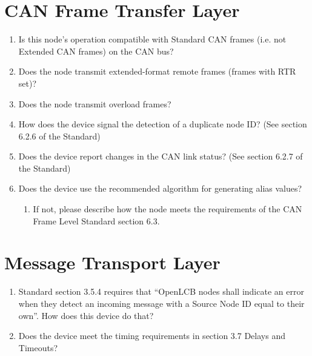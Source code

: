 \section{CAN Frame Transfer Layer}
    \begin{enumerate}
        \item Is this node's operation compatible with Standard CAN frames
            (i.e. not Extended CAN frames) on the CAN bus?
        \item Does the node transmit extended-format remote frames (frames with RTR set)?
        \item Does the node transmit overload frames?
        \item How does the device signal the detection of a duplicate node ID?
                (See section 6.2.6 of the Standard)
        \item Does the device report changes in the CAN link status? 
                (See section 6.2.7 of the Standard)
        \item Does the device use the recommended algorithm for generating alias values?
            \begin{enumerate}
                \item If not, please describe how the node meets the requirements of the 
                    CAN Frame Level Standard section 6.3.
            \end{enumerate}
    \end{enumerate}

\section{Message Transport Layer}
    \begin{enumerate}
        \item Standard section 3.5.4 requires that ``OpenLCB nodes shall indicate an 
            error when they detect an incoming message with a Source Node ID
            equal to their own''. How does this device do that?
        \item Does the device meet the timing requirements in section 3.7 Delays and Timeouts?
    \end{enumerate}

